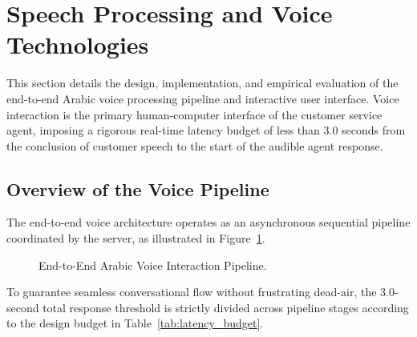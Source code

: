 
\section{Speech Processing and Voice Technologies}
\label{sec:speech_processing}

This section details the design, implementation, and empirical evaluation of the end-to-end Arabic voice processing pipeline and interactive user interface. Voice interaction is the primary human-computer interface of the customer service agent, imposing a rigorous real-time latency budget of less than 3.0 seconds from the conclusion of customer speech to the start of the audible agent response.

\subsection{Overview of the Voice Pipeline}
\label{subsec:pipeline_overview}

The end-to-end voice architecture operates as an asynchronous sequential pipeline coordinated by the server, as illustrated in Figure~\ref{fig:voice_pipeline_flow}.

\begin{figure}[htbp]
\centering
\begin{center}
\end{center}
\caption{End-to-End Arabic Voice Interaction Pipeline.}
\label{fig:voice_pipeline_flow}
\end{figure}

To guarantee seamless conversational flow without frustrating dead-air, the 3.0-second total response threshold is strictly divided across pipeline stages according to the design budget in Table~\ref{tab:latency_budget}.

